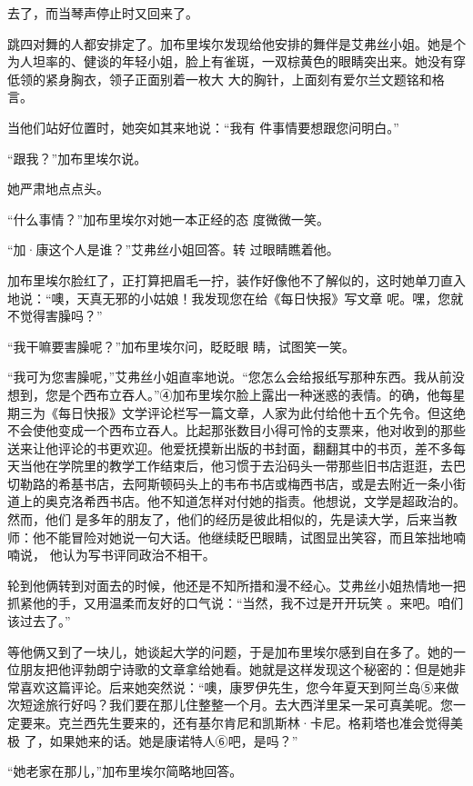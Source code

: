 \documentclass{article}
\begin{document}
去了，而当琴声停止时又回来了。 

跳四对舞的人都安排定了。加布里埃尔发现给他安排的舞伴是艾弗丝小姐。她是个为人坦率的、健谈的年轻小姐，脸上有雀斑，一双棕黄色的眼睛突出来。她没有穿低领的紧身胸衣，领子正面别着一枚大
大的胸针，上面刻有爱尔兰文题铭和格言。 

当他们站好位置时，她突如其来地说：“我有
件事情要想跟您问明白。” 


“跟我？”加布里埃尔说。 


她严肃地点点头。 

“什么事情？”加布里埃尔对她一本正经的态
度微微一笑。 

“加·康这个人是谁？”艾弗丝小姐回答。转
过眼睛瞧着他。 

\newpage

加布里埃尔脸红了，正打算把眉毛一拧，装作好像他不了解似的，这时她单刀直入地说：“噢，天真无邪的小姑娘！我发现您在给《每日快报》写文章
呢。嘿，您就不觉得害臊吗？” 

“我干嘛要害臊呢？”加布里埃尔问，眨眨眼
睛，试图笑一笑。 

“我可为您害臊呢，”艾弗丝小姐直率地说。“您怎么会给报纸写那种东西。我从前没想到，您是个西布立吞人。”④加布里埃尔脸上露出一种迷惑的表情。的确，他每星期三为《每日快报》文学评论栏写一篇文章，人家为此付给他十五个先令。但这绝不会使他变成一个西布立吞人。比起那张数目小得可怜的支票来，他对收到的那些送来让他评论的书更欢迎。他爱抚摸新出版的书封面，翻翻其中的书页，差不多每天当他在学院里的教学工作结束后，他习惯于去沿码头一带那些旧书店逛逛，去巴切勒路的希基书店，去阿斯顿码头上的韦布书店或梅西书店，或是去附近一条小街道上的奥克洛希西书店。他不知道怎样对付她的指责。他想说，文学是超政治的。然而，他们
\newpage
是多年的朋友了，他们的经历是彼此相似的，先是读大学，后来当教师：他不能冒险对她说一句大话。他继续眨巴眼睛，试图显出笑容，而且笨拙地喃喃说，
他认为写书评同政治不相干。 

轮到他俩转到对面去的时候，他还是不知所措和漫不经心。艾弗丝小姐热情地一把抓紧他的手，又用温柔而友好的口气说：“当然，我不过是开开玩笑
。来吧。咱们该过去了。” 

等他俩又到了一块儿，她谈起大学的问题，于是加布里埃尔感到自在多了。她的一位朋友把他评勃朗宁诗歌的文章拿给她看。她就是这样发现这个秘密的：但是她非常喜欢这篇评论。后来她突然说：“噢，康罗伊先生，您今年夏天到阿兰岛⑤来做次短途旅行好吗？我们要在那儿住整整一个月。去大西洋里呆一呆可真美呢。您一定要来。克兰西先生要来的，还有基尔肯尼和凯斯林·卡尼。格莉塔也准会觉得美极
了，如果她来的话。她是康诺特人⑥吧，是吗？” 

“她老家在那儿，”加布里埃尔简略地回答。
\newpage
\end{document}
